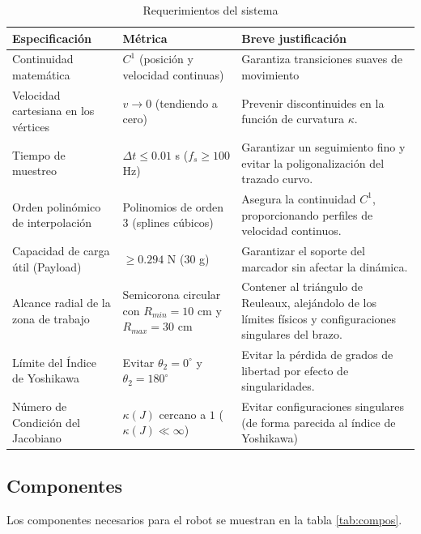 \documentclass[10pt, letterpaper]{article}
\begin{document}
\begin{table}[H]
    \centering
    \caption{Requerimientos del sistema}
    \label{tab:requerimientos}
    \begin{tabular}{|p{4.5cm}|p{4.5cm}|p{6cm}|}
    \hline
    \textbf{Especificación} & \textbf{Métrica} & \textbf{Breve justificación} \\ \hline
    Continuidad matemática & $C^1$ (posición y velocidad continuas) & Garantiza transiciones suaves de movimiento \\ \hline
    Velocidad cartesiana en los vértices & $v \to 0$ (tendiendo a cero) & Prevenir discontinuides en la función de curvatura $\kappa$. \\ \hline
    Tiempo de muestreo & $\Delta t \le 0.01$ s ($f_s \ge 100$ Hz) & Garantizar un seguimiento fino y evitar la poligonalización del trazado curvo. \\ \hline
    Orden polinómico de interpolación & Polinomios de orden 3 (splines cúbicos) & Asegura la continuidad $C^1$, proporcionando perfiles de velocidad continuos. \\ \hline
    Capacidad de carga útil (Payload) & $\ge 0.294$ N ($30$ g) & Garantizar el soporte del marcador sin afectar la dinámica. \\ \hline
    Alcance radial de la zona de trabajo & Semicorona circular con $R_{min} = 10$ cm y $R_{max} = 30$ cm & Contener al triángulo de Reuleaux, alejándolo de los límites físicos y configuraciones singulares del brazo. \\ \hline
    Límite del Índice de Yoshikawa & Evitar $\theta_2 = 0^\circ$ y $\theta_2 = 180^\circ$ & Evitar la pérdida de grados de libertad por efecto de singularidades. \\ \hline
    Número de Condición del Jacobiano & $\kappa(J)$ cercano a $1$ ($\kappa(J) \ll \infty$) & Evitar configuraciones singulares (de forma parecida al índice de Yoshikawa) \\ \hline
    \end{tabular}
\end{table}
 
\subsection{Componentes}

Los componentes necesarios para el robot se muestran en la tabla \ref{tab:compos}.
\end{document}
